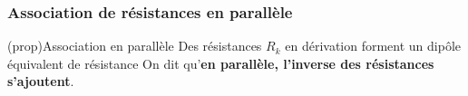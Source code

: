 \documentclass[../../main/main.tex]{subfiles}
\begin{document}
\subsubsection{Association de résistances en parallèle}
\begin{tcb*}[label=prop:rpara, sidebyside, righthand ratio=.40](prop){Association en parallèle}
	Des résistances $R_k$ en dérivation forment un dipôle équivalent de résistance
	\psw{%
		\[
			\boxed{\frac{1}{R\ind{eq}} = \sum_k \frac{1}{R_k}}
			\Lra
			\boxed{G_{\equ} = \sum_k G_k}
		\]
	}%
	On dit qu'\textbf{en parallèle, l'inverse des résistances s'ajoutent}.
	\tcblower
	\begin{center}
	\end{center}
\end{tcb*}
\end{document}
